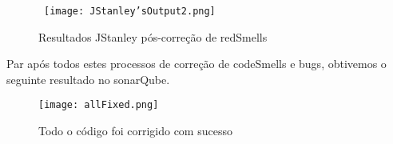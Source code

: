 \begin{figure}[H]

  \centering

  \hbox{\hspace{-8em} \texttt{[image: JStanley'sOutput2.png]}}

  \caption {Resultados JStanley pós-correção de redSmells}

  \label {fig29}

\end{figure}

\par Par após todos estes processos de correção de codeSmells e bugs, obtivemos o seguinte resultado no sonarQube.

\begin{figure}[H]

  \centering

  \texttt{[image: allFixed.png]}

  \caption {Todo o código foi corrigido com sucesso}

  \label {fig27}

\end{figure}
\newpage